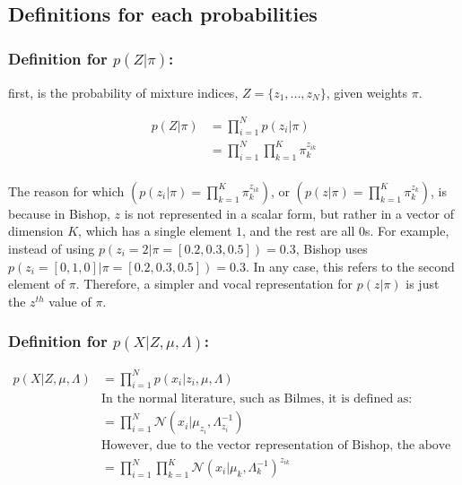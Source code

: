 \documentclass{article}
\begin{document}
\subsection{Definitions for each probabilities}

\subsubsection{Definition for $p(Z| \pi)$:}

first, is the probability of mixture indices, $Z = \{ z_1, ..., z_N\}$, given weights $\pi$.

\begin{equation}
\begin{split}
p (Z |\pi) &= \prod^N_{i=1} p(z_i|\pi)\\
&= \prod^N_{i=1} \prod^K_{k=1} \pi^{z_{ik}}_k\\
\end{split}
\end{equation}

The reason for which $\left(p(z_i|\pi) = \prod^K_{k=1} \pi^{z_{ik}}_k \right)$, or $\left(p(z|\pi) = \prod^K_{k=1} \pi^{z_{k}}_k\right)$, is because in Bishop, $z$ is not represented in a scalar form, but rather in a vector of dimension $K$, which has a single element $1$, and the rest are all $0$s. For example, instead of using $p(z_i = 2 | \pi = [0.2, 0.3, 0.5]) = 0.3 $, Bishop uses $p(z_i = [0, 1, 0] | \pi = [0.2, 0.3, 0.5]) = 0.3 $. In any case, this refers to the second element of $\pi$. Therefore, a simpler and vocal representation for $p(z|\pi)$ is just the $z^{th}$ value of $\pi$.

\subsubsection{Definition for $p(X| Z, \mu, \Lambda)$:}

\begin{equation}
\begin{split}
p(X| Z, \mu, \Lambda) &= \prod^N_{i=1} p(x_i | z_i, \mu, \Lambda)\\
&\text{In the normal literature, such as Bilmes, it is defined as:}\\
&= \prod^N_{i=1} \mathcal{N}(x_i | \mu_{z_i}, \Lambda_{z_i}^{-1})\\
&\text{However, due to the vector representation of Bishop, the above is defined as:}\\
&= \prod^N_{i=1} \prod^K_{k=1} \mathcal{N}(x_i | \mu_{k}, \Lambda_{k}^{-1})^{z_{ik}}\\
\end{split}
\end{equation}
\end{document}
